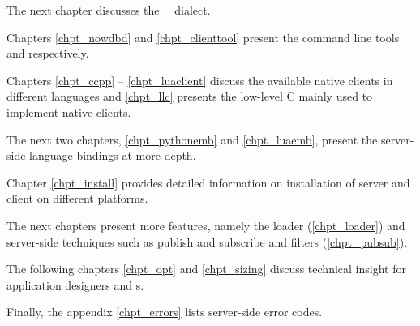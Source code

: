 The next chapter discusses the \nowdb\ \sql\ dialect.

Chapters \ref{chpt_nowdbd} and \ref{chpt_clienttool}
present the command line tools 
and  respectively.

Chapters \ref{chpt_ccpp} -- \ref{chpt_luaclient}
discuss the available native clients in different
languages and \ref{chpt_llc} presents the low-level
C  mainly used to implement
native clients.

The next two chapters, \ref{chpt_pythonemb} and
\ref{chpt_luaemb}, present the server-side
language bindings at more depth.

Chapter \ref{chpt_install} provides detailed information
on installation of server and client on different
platforms.

The next chapters present more features,
namely the loader (\ref{chpt_loader}) and
server-side techniques such as publish and subscribe and
filters (\ref{chpt_pubsub}).

The following chapters 
\ref{chpt_opt} and \ref{chpt_sizing}
discuss technical insight
for application designers and s.

Finally, the appendix \ref{chpt_errors} lists server-side
error codes.


